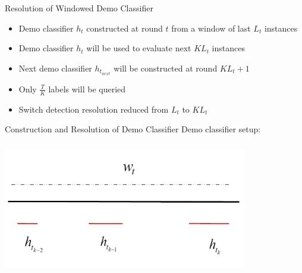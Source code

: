 \documentclass{beamer}
\begin{document}
\begin{frame}{Resolution of Windowed Demo Classifier}

\begin{itemize}
\item Demo classifier $h_t$ constructed at round $t$ from a window of last $L_t$ instances\newline
\item Demo classifier $h_t$ will be used to evaluate next  $KL_t$ instances\newline
\item Next demo classifier $h_{t_{next}}$ will be constructed at round $KL_t+1$\newline
\item Only $\frac{T}{K}$ labels will be queried\newline
\item Switch detection resolution reduced from $L_t$ to $KL_t$
\end{itemize}

\end{frame}

\begin{frame}{Construction and Resolution of Demo  Classifier}
Demo classifier setup:
\begin{center}
\includegraphics[height=2.3in,width=4.2in]{classifier3.jpg}
\end{center}
\end{frame}
\end{document}
